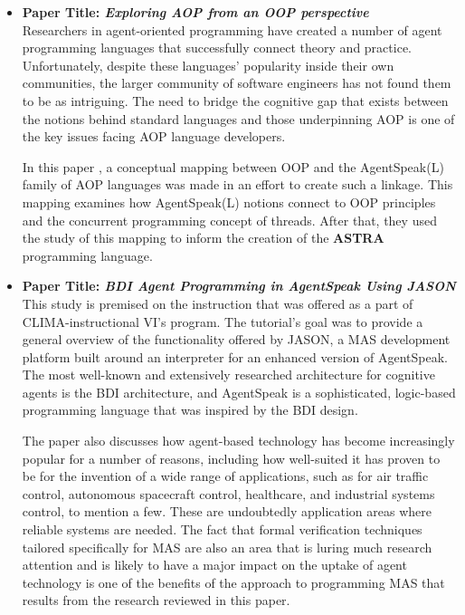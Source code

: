 \begin{itemize}[label={}]
\item \textbf{Paper Title: \textit{Exploring AOP from an OOP perspective}}\\

Researchers in agent-oriented programming have created a number of agent programming languages that successfully connect theory and practice. Unfortunately, despite these languages' popularity inside their own communities, the larger community of software engineers has not found them to be as intriguing. The need to bridge the cognitive gap that exists between the notions behind standard languages and those underpinning \ac{AOP} is one of the key issues facing \ac{AOP} language developers. 
 
 \vspace{.5cm}
 
In this paper \cite{astra}, a conceptual mapping between \ac{OOP} and the AgentSpeak(L) family of \ac{AOP} languages was made in an effort to create such a linkage. This mapping examines how AgentSpeak(L) notions connect to \ac{OOP} principles and the concurrent programming concept of threads. After that, they used the study of this mapping to inform the creation of the \textbf{\ac{ASTRA}} programming language.

 \vspace{.5cm}
 
\item \textbf{Paper Title: \textit{\ac{BDI} Agent Programming in AgentSpeak Using JASON}} \\

This study \cite{jasonBDI} is premised on the instruction that was offered as a part of CLIMA-instructional VI's program. The tutorial's goal was to provide a general overview of the functionality offered by JASON, a \ac{MAS} development platform built around an interpreter for an enhanced version of AgentSpeak. The most well-known and extensively researched architecture for cognitive agents is the \ac{BDI} architecture, and AgentSpeak is a sophisticated, logic-based programming language that was inspired by the \ac{BDI} design.

\vspace{.5cm}

The paper also discusses how agent-based technology has become increasingly popular for a number of reasons, including how well-suited it has proven to be for the invention of a wide range of applications, such as for air traffic control, autonomous spacecraft control, healthcare, and industrial systems control, to mention a few. These are undoubtedly application areas where reliable systems are needed. The fact that formal verification techniques tailored specifically for \ac{MAS} are also an area that is luring much research attention and is likely to have a major impact on the uptake of agent technology is one of the benefits of the approach to programming \ac{MAS} that results from the research reviewed in this paper.


\end{itemize}
